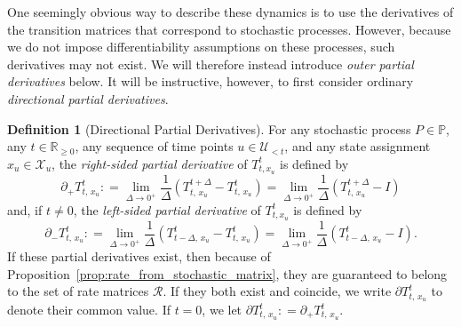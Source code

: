 \documentclass[10pt,a4paper]{paper}
\theoremstyle{definition}
\newtheorem{definition}{Definition}
\newcommand{\reals}{\mathbb{R}}
\newcommand{\realsnonneg}{\reals_{\geq 0}}
\newcommand{\states}{\mathcal{X}}
\newcommand{\processes}{\mathbb{P}}
\newcommand{\coloneqq}{:\!=}
\begin{document}
One seemingly obvious way to describe these dynamics is to use the derivatives of the transition matrices that correspond to stochastic processes. However, because we do not impose differentiability assumptions on these processes, such derivatives may not exist. We will therefore instead introduce \emph{outer partial derivatives} below. It will be instructive, however, to first consider ordinary \emph{directional partial derivatives}.

\begin{definition}[Directional Partial Derivatives]\label{def:direc_partial_deriv}
For any stochastic process $P\in\processes$, any $t\in\realsnonneg$, any sequence of time points $u\in\mathcal{U}_{<t}$, and any state assignment $x_u\in\states_u$, the \emph{right-sided partial derivative} of $T_{t,x_u}^t$ is defined by
\begin{equation*}
\partial_{+}{T_{t,\,x_u}^t}
\coloneqq
\lim_{\Delta\to 0^{+}}
\frac{1}{\Delta}
(T^{t+\Delta}_{t,\,x_u}-T^t_{t,\,x_u})
=
\lim_{\Delta\to 0^{+}}
\frac{1}{\Delta}
(T^{t+\Delta}_{t,\,x_u}-I)
\end{equation*}
and, if $t\neq0$, the \emph{left-sided partial derivative} of $T_{t,x_u}^t$ is defined by
\begin{equation*}
\partial_{-}{T_{t,\,x_u}^t}
\coloneqq
\lim_{\Delta\to 0^{+}}
\frac{1}{\Delta}
(T^{t}_{t-\Delta,\,x_u}-T^t_{t,\,x_u})
=
\lim_{\Delta\to 0^{+}}
\frac{1}{\Delta}
(T^{t}_{t-\Delta,\,x_u}-I).
\end{equation*}
If these partial derivatives exist, then because of Proposition~\ref{prop:rate_from_stochastic_matrix}, they are guaranteed to belong to the set of rate matrices  $\mathcal{R}$. If they both exist and coincide, we write $\partial{T_{t,\,x_u}^t}$ to denote their common value. If $t=0$, we let $\partial{T_{t,\,x_u}^t}\coloneqq\partial_{+}{T_{t,\,x_u}^t}$.
\end{definition}
\end{document}

